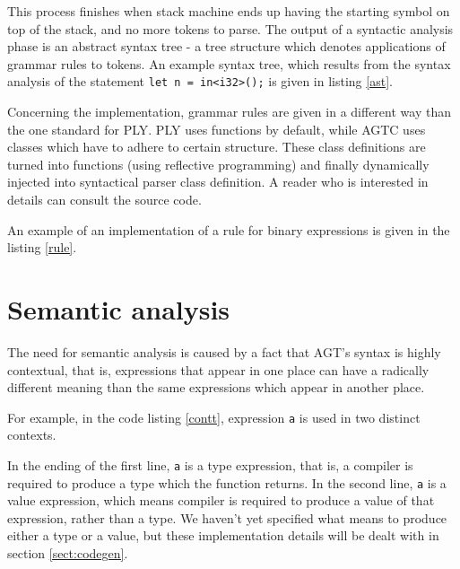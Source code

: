 \documentclass[times, utf8, diplomski]{fer}
\theoremstyle{definition}
\newcommand{\textcode}[3]{
    
}
\begin{document}
This process finishes when stack machine ends up having the starting symbol on top of the stack,
and no more tokens to parse. 
The output of a syntactic analysis phase is an abstract syntax tree - a tree structure
which denotes applications of grammar rules to tokens. An example syntax tree, which
results from the syntax analysis of the statement \texttt{let n = in<i32>();} is given in listing \ref{ast}.

\textcode{\resdir/compiler/ast}{ast}{AST resulting from \texttt{let n = in<i32>();}}

Concerning the implementation, grammar rules are given in a different way than the
one standard for PLY. PLY uses functions by default, while AGTC uses
classes which have to adhere to certain structure. These class definitions
are turned into functions (using reflective programming) and finally
dynamically injected into syntactical parser class definition.
A reader who is interested in details can consult the source code.

An example of an implementation of a rule for binary expressions is given in the listing \ref{rule}.
\\

\textcode{\resdir/compiler/rule.py}{rule}{Binary expression rule implementation}

\section{Semantic analysis}

The need for semantic analysis is caused by a fact that AGT's syntax is highly contextual,
that is, expressions that appear in one place can have a radically different meaning
than the same expressions which appear in another place.

For example, in the code listing \ref{contt}, expression \texttt{a} is used in two distinct contexts.

\textcode{\resdir/compiler/contextual.agt}{contt}{Contextuality of expression \texttt{a}}

In the ending of the first line, \texttt{a} is a type expression, that is, a
compiler is required to produce a type which the function returns. In the
second line, \texttt{a} is a value expression,
which means compiler is required to produce a value of that expression, rather than a type.
We haven't yet specified what means to produce either a type or a value, but these implementation
details will be dealt with in section \ref{sect:codegen}.
\end{document}
